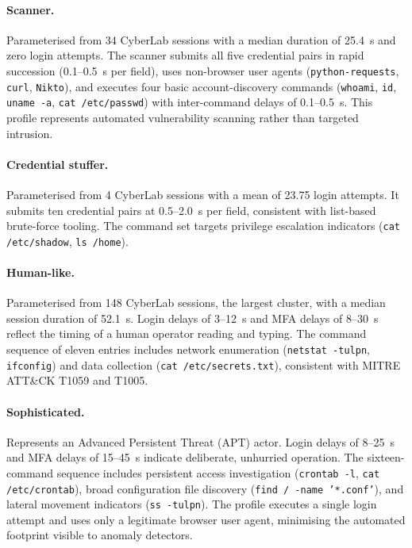 \paragraph{Scanner.}
Parameterised from 34 CyberLab sessions with a median duration of 25.4~s and
zero login attempts. The scanner submits all five credential pairs in rapid
succession (0.1–0.5~s per field), uses non-browser user agents
(\texttt{python-requests}, \texttt{curl}, \texttt{Nikto}), and executes four
basic account-discovery commands (\texttt{whoami}, \texttt{id},
\texttt{uname -a}, \texttt{cat /etc/passwd}) with inter-command delays of
0.1–0.5~s. This profile represents automated vulnerability scanning rather than
targeted intrusion.

\paragraph{Credential stuffer.}
Parameterised from 4 CyberLab sessions with a mean of 23.75 login attempts.
It submits ten credential pairs at 0.5–2.0~s per field, consistent with
list-based brute-force tooling. The command set targets privilege escalation
indicators (\texttt{cat /etc/shadow}, \texttt{ls /home}).

\paragraph{Human-like.}
Parameterised from 148 CyberLab sessions, the largest cluster, with a median
session duration of 52.1~s. Login delays of 3–12~s and MFA delays of 8–30~s
reflect the timing of a human operator reading and typing. The command sequence
of eleven entries includes network enumeration (\texttt{netstat -tulpn},
\texttt{ifconfig}) and data collection (\texttt{cat /etc/secrets.txt}),
consistent with MITRE ATT\&CK T1059 and T1005\@.

\paragraph{Sophisticated.}
Represents an Advanced Persistent Threat (APT) actor. Login delays of 8–25~s
and MFA delays of 15–45~s indicate deliberate, unhurried operation. The
sixteen-command sequence includes persistent access investigation
(\texttt{crontab -l}, \texttt{cat /etc/crontab}), broad configuration file
discovery (\texttt{find / -name '*.conf'}), and lateral movement indicators
(\texttt{ss -tulpn}). The profile executes a single login attempt and uses only
a legitimate browser user agent, minimising the automated footprint visible to
anomaly detectors.


